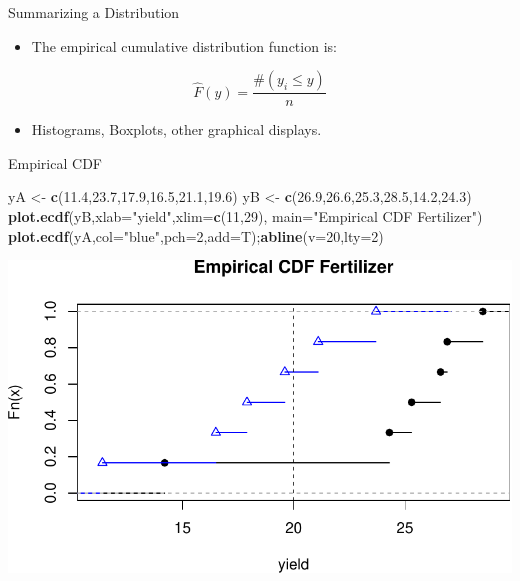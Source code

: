 \documentclass[10pt,ignorenonframetext,]{beamer}
\newenvironment{Shaded}{\begin{snugshade}}{\end{snugshade}}
\newcommand{\KeywordTok}[1]{\textcolor[rgb]{0.13,0.29,0.53}{\textbf{{#1}}}}
\newcommand{\DataTypeTok}[1]{\textcolor[rgb]{0.13,0.29,0.53}{{#1}}}
\newcommand{\DecValTok}[1]{\textcolor[rgb]{0.00,0.00,0.81}{{#1}}}
\newcommand{\FloatTok}[1]{\textcolor[rgb]{0.00,0.00,0.81}{{#1}}}
\newcommand{\StringTok}[1]{\textcolor[rgb]{0.31,0.60,0.02}{{#1}}}
\newcommand{\NormalTok}[1]{{#1}}
\providecommand{\tightlist}{%
\setlength{\itemsep}{0pt}\setlength{\parskip}{0pt}}
\begin{document}
\begin{frame}{Summarizing a Distribution}

\begin{itemize}
\tightlist
\item
  The empirical cumulative distribution function is:
\end{itemize}

\[{\hat F}(y)=\frac{\#(y_i \le y)}{n}\]

\begin{itemize}
\tightlist
\item
  Histograms, Boxplots, other graphical displays.
\end{itemize}

\end{frame}

\begin{frame}[fragile]{Empirical CDF}

\begin{Shaded}
\begin{Highlighting}[]
\NormalTok{yA <-}\StringTok{ }\KeywordTok{c}\NormalTok{(}\FloatTok{11.4}\NormalTok{,}\FloatTok{23.7}\NormalTok{,}\FloatTok{17.9}\NormalTok{,}\FloatTok{16.5}\NormalTok{,}\FloatTok{21.1}\NormalTok{,}\FloatTok{19.6}\NormalTok{)}
\NormalTok{yB <-}\StringTok{ }\KeywordTok{c}\NormalTok{(}\FloatTok{26.9}\NormalTok{,}\FloatTok{26.6}\NormalTok{,}\FloatTok{25.3}\NormalTok{,}\FloatTok{28.5}\NormalTok{,}\FloatTok{14.2}\NormalTok{,}\FloatTok{24.3}\NormalTok{)}
\KeywordTok{plot.ecdf}\NormalTok{(yB,}\DataTypeTok{xlab=}\StringTok{"yield"}\NormalTok{,}\DataTypeTok{xlim=}\KeywordTok{c}\NormalTok{(}\DecValTok{11}\NormalTok{,}\DecValTok{29}\NormalTok{),}
          \DataTypeTok{main=}\StringTok{"Empirical CDF Fertilizer"}\NormalTok{)}
\KeywordTok{plot.ecdf}\NormalTok{(yA,}\DataTypeTok{col=}\StringTok{"blue"}\NormalTok{,}\DataTypeTok{pch=}\DecValTok{2}\NormalTok{,}\DataTypeTok{add=}\NormalTok{T);}\KeywordTok{abline}\NormalTok{(}\DataTypeTok{v=}\DecValTok{20}\NormalTok{,}\DataTypeTok{lty=}\DecValTok{2}\NormalTok{)}
\end{Highlighting}
\end{Shaded}

\includegraphics{class3slides-jan16_files/figure-beamer/unnamed-chunk-2-1.pdf}

\end{frame}
\end{document}
